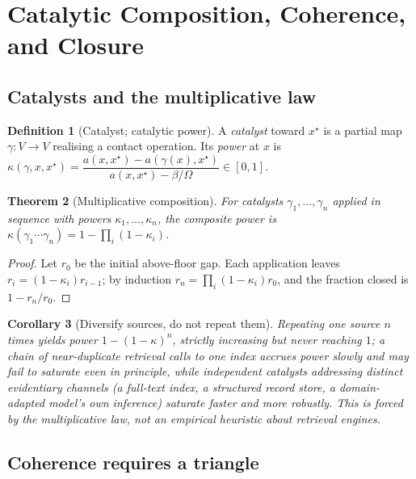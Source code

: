 \documentclass[11pt,twocolumn,a4paper]{article}
\theoremstyle{frathm}
\newtheorem{theorem}{Theorem}[section]
\newtheorem{corollary}[theorem]{Corollary}
\theoremstyle{definition}
\newtheorem{definition}[theorem]{Definition}
\theoremstyle{remark}
\newcommand{\V}{V}
\newcommand{\flo}{\beta}
\newcommand{\Om}{\Omega}
\newcommand{\al}{a}
\newcommand{\pot}{\kappa}
\begin{document}
\section{Catalytic Composition, Coherence, and Closure}
\label{sec:catalysis}

\subsection{Catalysts and the multiplicative law}

\begin{definition}[Catalyst; catalytic power]
\label{def:catalyst}
A \emph{catalyst} toward $x^{\star}$ is a partial map $\gamma:\V\to\V$
realising a contact operation. Its \emph{power} at $x$ is
$\pot(\gamma,x,x^{\star})=\dfrac{\al(x,x^{\star})-\al(\gamma(x),x^{\star})}
{\al(x,x^{\star})-\flo/\Om}\in[0,1]$.
\end{definition}

\begin{theorem}[Multiplicative composition]
\label{thm:multiplicative}
For catalysts $\gamma_1,\dots,\gamma_n$ applied in sequence with powers
$\pot_1,\dots,\pot_n$, the composite power is
$\pot(\gamma_1\cdots\gamma_n)=1-\prod_i(1-\pot_i)$.
\end{theorem}

\begin{proof}
Let $r_0$ be the initial above-floor gap. Each application leaves
$r_i=(1-\pot_i)r_{i-1}$; by induction $r_n=\prod_i(1-\pot_i)r_0$, and the
fraction closed is $1-r_n/r_0$.
\end{proof}

\begin{corollary}[Diversify sources, do not repeat them]
\label{cor:diversify}
Repeating one source $n$ times yields power $1-(1-\pot)^n$, strictly
increasing but never reaching $1$; a chain of near-duplicate retrieval
calls to one index accrues power slowly and may fail to saturate even in
principle, while independent catalysts addressing distinct evidentiary
channels (a full-text index, a structured record store, a domain-adapted
model's own inference) saturate faster and more robustly. This is forced
by the multiplicative law, not an empirical heuristic about retrieval
engines.
\end{corollary}

\subsection{Coherence requires a triangle}
\end{document}
